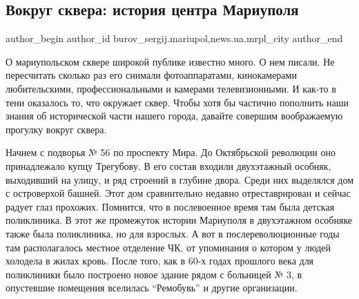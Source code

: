  
 
 
 
 
 
\subsection{Вокруг сквера: история центра Мариуполя}
\label{sec:17_08_2019.stz.news.ua.mrpl_city.1.vokrug_skvera_istoria_centra_mariupolja}
 
\ifcmt
 author_begin
   author_id burov_sergij.mariupol,news.ua.mrpl_city
 author_end
\fi


О мариупольском сквере широкой публике известно много. О нем писали. Не
пересчитать сколько раз его снимали фотоаппаратами, кинокамерами любительскими,
профессиональными и камерами телевизионными. И как-то в тени оказалось то, что
окружает сквер. Чтобы хотя бы частично пополнить наши знания об исторической
части нашего города, давайте совершим воображаемую прогулку вокруг сквера.

Начнем с подворья № 56 по проспекту Мира. До Октябрьской революции оно
принадлежало купцу Трегубову. В его состав входили двухэтажный особняк,
выходивший на улицу, и ряд строений в глубине двора. Среди них выделялся дом с
островерхой башней. Этот дом сравнительно недавно отреставрирован и сейчас
радует глаз прохожих. Помнится, что в послевоенное время там была детская
поликлиника. В этот же промежуток истории Мариуполя в двухэтажном особняке
также была поликлиника, но для взрослых. А вот в послереволюционные годы там
располагалось местное отделение ЧК, от упоминания о котором у людей холодела в
жилах кровь. После того, как в 60-х годах прошлого века для поликлиники было
построено новое здание рядом с больницей № 3, в опустевшие помещения вселилась
\enquote{Ремобувь} и другие организации.

